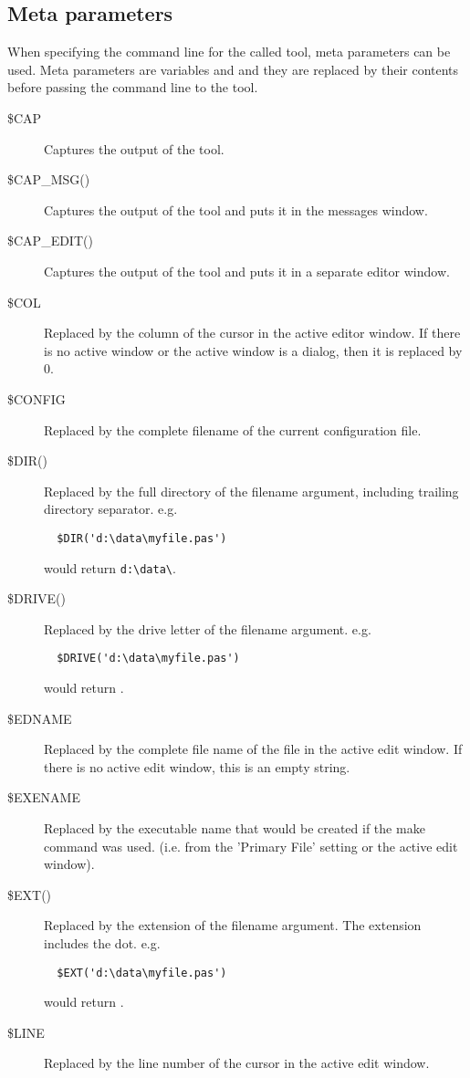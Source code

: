 \subsection{Meta parameters}
When specifying the command line for the called tool, meta parameters can
be used. Meta parameters are variables and and they are replaced
by their contents before passing the command line to the tool.

\begin{description}
\item[\$CAP]
Captures the output of the tool.
\item[\$CAP\_MSG()]
Captures the output of the tool and puts it in the messages window.
\item[\$CAP\_EDIT()]
Captures the output of the tool and puts it in a separate editor window.
\item[\$COL]
Replaced by the column of the cursor in the active editor window. If there is no
 active window or the active window is a dialog, then it is replaced by 0.
\item[\$CONFIG]
Replaced by the complete filename of the current configuration file.
\item[\$DIR()]
Replaced by the full directory of the filename argument, including trailing
directory separator. e.g.
\begin{verbatim}
  $DIR('d:\data\myfile.pas')
\end{verbatim}
would return \verb|d:\data\|.
\item[\$DRIVE()]
Replaced by the drive letter of the filename argument. e.g.
\begin{verbatim}
  $DRIVE('d:\data\myfile.pas')
\end{verbatim}
would return .
\item[\$EDNAME]
Replaced by the complete file name of the file in the active edit window.
If there is no active edit window, this is an empty string.
\item[\$EXENAME]
Replaced by the executable name that would be created if the make command
was used. (i.e. from the 'Primary File' setting or the active edit window).
\item[\$EXT()]
Replaced by the extension of the filename argument.
The extension includes the dot.
e.g.
\begin{verbatim}
  $EXT('d:\data\myfile.pas')
\end{verbatim}
would return .
\item[\$LINE]
Replaced by the line number of the cursor in the active edit window.

\end{description}
